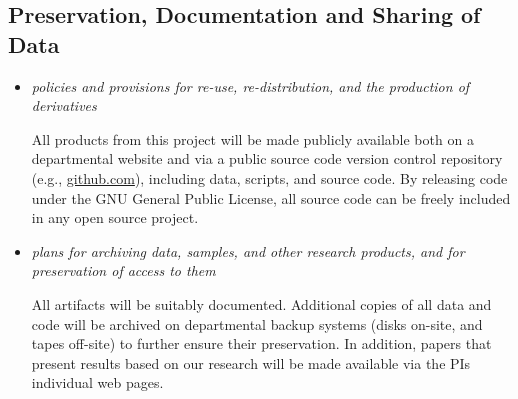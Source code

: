 \subsection*{Preservation, Documentation and Sharing of Data}

\begin{itemize}
\item \emph{policies and provisions for re-use, re-distribution, and the production of derivatives}

All products from this project will be made publicly available both on
a departmental website and via a public source code version control
repository (e.g., \url{github.com}), including data, scripts, and source
code. By releasing code under the GNU General Public License, all
source code can be freely included in any open source project.

\item \emph{plans for archiving data, samples, and other research products, and for preservation of access to them}

All artifacts will be suitably documented. Additional copies of all
data and code will be archived on departmental backup systems (disks
on-site, and tapes off-site) to further ensure their preservation. In
addition, papers that present results based on our research will be
made available via the PIs individual web pages.

\end{itemize}



